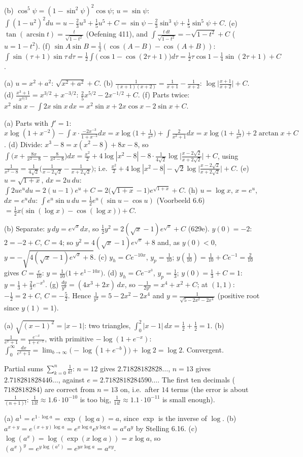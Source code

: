  (b) $\cos^5\psi=(1-\sin^2\psi)^2\cos\psi$; $u=\sin\psi$: $\int(1-u^2)^2du=u-\frac23u^3+\frac15u^5+C=\sin\psi-\frac23\sin^3\psi+\frac15\sin^5\psi+C$. (e) $\tan(\arcsin t)=\frac t{\sqrt{1-t^2}}$ (Oefening 411), and $\int\frac{t\,dt}{\sqrt{1-t^2}}=-\sqrt{1-t^2}+C$ ($u=1-t^2$). (f) $\sin A\sin B=\frac12(\cos(A-B)-\cos(A+B))$: $\int\sin(\tau+1)\sin\tau\,d\tau=\frac12\int\big(\cos1-\cos(2\tau+1)\big)d\tau=\frac12\tau\cos1-\frac14\sin(2\tau+1)+C$.

 (a) $u=x^2+a^2$: $\sqrt{x^2+a^2}+C$. (b) $\frac1{(x+1)(x+2)}=\frac1{x+1}-\frac1{x+2}$: $\log\Big|\frac{x+1}{x+2}\Big|+C$. (d) $\frac{x^3+1}{x^{3/2}}=x^{3/2}+x^{-3/2}$: $\frac25x^{5/2}-2x^{-1/2}+C$. (f) Parts twice: $x^2\sin x-\int2x\sin x\,dx=x^2\sin x+2x\cos x-2\sin x+C$.

 (a) Parts with $f'=1$: $x\log(1+x^{-2})-\int x\cdot\frac{-2x^{-3}}{1+x^{-2}}dx=x\log\big(1+\frac1{x^2}\big)+\int\frac{2}{x^2+1}dx=x\log\big(1+\frac1{x^2}\big)+2\arctan x+C$. (d) Divide: $x^3-8=x(x^2-8)+8x-8$, so $\int\Big(x+\frac{8x}{x^2-8}-\frac8{x^2-8}\Big)dx=\frac{x^2}2+4\log|x^2-8|-8\cdot\frac1{4\sqrt2}\log\Big|\frac{x-2\sqrt2}{x+2\sqrt2}\Big|+C$, using $\frac1{x^2-8}=\frac1{4\sqrt2}\Big(\frac1{x-2\sqrt2}-\frac1{x+2\sqrt2}\Big)$; i.e.\ $\frac{x^2}2+4\log|x^2-8|-\sqrt2\log\Big|\frac{x-2\sqrt2}{x+2\sqrt2}\Big|+C$. (e) $u=\sqrt{1+x}$, $dx=2u\,du$: $\int2ue^udu=2(u-1)e^u+C=2\big(\sqrt{1+x}-1\big)e^{\sqrt{1+x}}+C$. (h) $u=\log x$, $x=e^u$, $dx=e^udu$: $\int e^u\sin u\,du=\frac12e^u(\sin u-\cos u)$ (Voorbeeld 6.6) $=\frac12x\big(\sin(\log x)-\cos(\log x)\big)+C$.

 (b) Separate: $y\,dy=e^{\sqrt x}dx$, so $\frac12y^2=2(\sqrt x-1)e^{\sqrt x}+C$ (629e). $y(0)=-2$: $2=-2+C$, $C=4$; so $y^2=4(\sqrt x-1)e^{\sqrt x}+8$ and, as $y(0)<0$, $y=-\sqrt{4(\sqrt x-1)e^{\sqrt x}+8}$. (c) $y_h=Ce^{-10x}$, $y_p=\frac1{10}$; $y(\frac1{10})=\frac1{10}+Ce^{-1}=\frac2{10}$ gives $C=\frac e{10}$: $y=\frac1{10}\big(1+e^{1-10x}\big)$. (d) $y_h=Ce^{-x^3}$, $y_p=\frac13$; $y(0)=\frac13+C=1$: $y=\frac13+\frac23e^{-x^3}$. (g) $\frac{dy}{y^3}=(4x^3+2x)\,dx$, so $-\frac1{2y^2}=x^4+x^2+C$; at $(1,1)$: $-\frac12=2+C$, $C=-\frac52$. Hence $\frac1{y^2}=5-2x^2-2x^4$ and $y=\frac1{\sqrt{5-2x^2-2x^4}}$ (positive root since $y(1)=1$).

 (a) $\sqrt{(x-1)^2}=|x-1|$: two triangles, $\int_0^2|x-1|\,dx=\frac12+\frac12=1$. (b) $\frac1{e^x+1}=\frac{e^{-x}}{1+e^{-x}}$, with primitive $-\log(1+e^{-x})$: $\int_0^\infty\frac{dx}{e^x+1}=\lim_{b\to\infty}\big(-\log(1+e^{-b})\big)+\log2=\log2$. Convergent.

 Partial sums $\sum_{k=0}^n\frac1{k!}$: $n=12$ gives $2.71828182828\ldots$, $n=13$ gives $2.718281828446\ldots$, against $e=2.7182818284590\ldots$. The first ten decimals ($7182818284$) are correct from $n=13$ on, i.e.\ after $14$ terms (the error is about $\frac1{(n+1)!}$: $\frac1{13!}\approx1.6\cdot10^{-10}$ is too big, $\frac1{14!}\approx1.1\cdot10^{-11}$ is small enough).

 (a) $a^1=e^{1\cdot\log a}=\exp(\log a)=a$, since $\exp$ is the inverse of $\log$. (b) $a^{x+y}=e^{(x+y)\log a}=e^{x\log a}e^{y\log a}=a^xa^y$ by Stelling 6.16. (c) $\log(a^x)=\log(\exp(x\log a))=x\log a$, so $(a^x)^y=e^{y\log(a^x)}=e^{yx\log a}=a^{xy}$.
